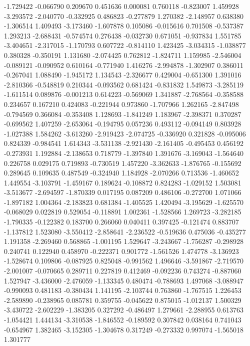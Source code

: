-1.729422
-0.066790
0.209670
0.451636
0.000081
0.760118
-0.823007
1.459928
-3.293572
-2.040770
-0.332925
0.486823
-0.277879
1.270382
-2.148957
0.638380
-1.306514
1.409493
-3.173460
-1.607878
0.105086
-0.015616
0.701508
-0.537387
1.293213
-2.688431
-0.574574
0.276438
-0.032730
0.671051
-0.937834
1.551785
-3.404651
-2.317015
-1.170793
0.607722
-0.814110
1.423425
-3.034315
-1.038877
0.380328
-0.350191
1.131680
-2.074425
0.762812
-1.824711
1.159985
-2.546004
-0.089121
-0.090952
0.610164
-0.771940
1.416276
-2.994878
-1.302907
0.386011
-0.267041
1.088490
-1.945172
1.134543
-2.326677
0.429004
-0.651300
1.391016
-2.810366
-0.548819
0.210344
-0.093562
0.681424
-0.831832
1.549873
-3.285119
-1.611514
0.089876
-0.001213
0.614223
-0.569069
1.341887
-2.768564
-0.358588
0.234657
0.167210
0.424083
-0.221944
0.973860
-1.707966
1.262165
-2.847498
-0.794569
0.366084
-0.353408
1.128693
-1.841249
1.183967
-2.398371
0.370287
-0.699562
1.407259
-2.653064
-0.194795
0.057236
0.493112
-0.094149
0.803928
-1.027388
1.584262
-3.613260
-2.919423
-2.074725
-0.336920
0.321828
-0.095006
0.824339
-0.984541
1.614343
-3.531138
-2.921430
-2.161405
-0.495453
0.456192
-0.273931
1.192884
-2.138653
0.718779
-1.397840
1.391676
-3.169043
-1.564640
0.226758
0.029175
0.719893
-0.730519
1.457220
-3.362633
-1.876765
-0.155692
0.289645
0.109635
0.487549
-0.324940
1.184928
-2.070266
0.713536
-1.460652
1.449554
-3.103791
-1.459167
0.189624
-0.108872
0.824283
-1.029152
1.503081
-3.513677
-2.694597
-1.870339
0.017195
0.087209
0.486106
-0.272700
1.071066
-1.897182
1.004364
-2.183823
0.681384
-1.405525
1.420494
-3.195629
-1.625570
-0.068029
0.022819
0.529054
-0.118891
1.002361
-1.528566
1.269723
-3.282185
-1.790335
-0.122382
0.183700
0.266060
0.040411
0.397425
-0.121474
0.883707
-1.137812
1.523080
-3.550412
-2.858641
-2.236522
-0.519636
0.475036
-0.435277
1.191358
-2.269460
0.568865
-1.001195
1.529647
-3.243667
-1.756287
-0.298928
0.240741
0.122940
0.458970
-0.222371
0.901772
-1.561526
1.474778
-3.136923
-1.528674
0.109806
-0.087925
0.825048
-0.991562
1.496646
-3.591867
-2.719570
-2.001007
-0.070665
0.289711
0.227819
0.412469
-0.092236
0.743274
-0.887060
1.527947
-3.436000
-2.476059
-1.133345
0.480474
-0.788693
1.497068
-3.088947
-0.990093
0.481183
-0.380434
1.141195
-2.103744
0.763860
-1.767515
1.226453
-2.589890
-0.238965
0.085781
0.359755
-0.045622
0.875015
-1.012137
1.500329
-3.430722
-2.602229
-1.383205
0.327292
-0.486497
1.279661
-2.288955
0.613763
-1.054421
1.444134
-3.310538
-1.846552
-0.189592
0.307842
0.038164
0.741043
-0.654967
1.382465
-3.152305
-1.304678
0.317249
-0.273332
0.997074
-1.565018
1.301777
